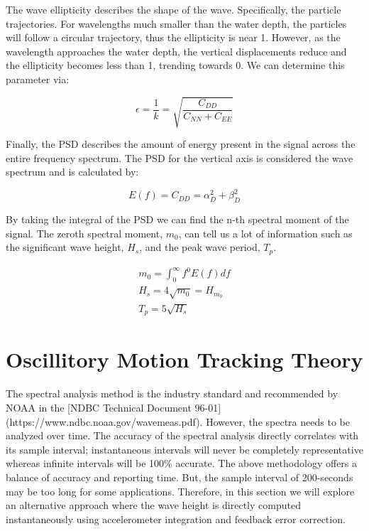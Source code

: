 The wave ellipticity describes the shape of the wave. 
Specifically, the particle trajectories. 
For wavelengths much smaller than the water depth, the particles will follow a circular trajectory, thus the ellipticity is near 1. 
However, as the wavelength approaches the water depth, the vertical displacements reduce and the ellipticity becomes less than 1, trending towards 0. 
We can determine this parameter via:

\begin{equation}
    \epsilon = \frac{1}{k} = \sqrt{\frac{C_{DD}}{C_{NN}+C_{EE}}}
\end{equation}

Finally, the PSD describes the amount of energy present in the signal across the entire frequency spectrum. 
The PSD for the vertical axis is considered the wave spectrum and is calculated by:

\begin{equation}
    E(f) = C_{DD} = \alpha^2_D + \beta^2_D
\end{equation}

By taking the integral of the PSD we can find the n-th spectral moment of the signal. 
The zeroth spectral moment, $m_0$, can tell us a lot of information such as the significant wave height, $H_s$, and the peak wave period, $T_p$.

\begin{gather}
    m_0 = \int^\infty_0 f^0E(f)df \\
    H_s = 4\sqrt{m_0} = H_{m_0} \\
    T_p = 5 \sqrt{H_s}
\end{gather}

\section{Oscillitory Motion Tracking Theory}

The spectral analysis method is the industry standard and recommended by NOAA in the [NDBC Technical Document 96-01](https://www.ndbc.noaa.gov/wavemeas.pdf). 
However, the spectra needs to be analyzed over time. 
The accuracy of the spectral analysis directly correlates with its sample interval; instantaneous intervals will never be completely representative whereas infinite intervals will be 100\% accurate.
The above methodology offers a balance of accuracy and reporting time. 
But, the sample interval of 200-seconds may be too long for some applications. 
Therefore, in this section we will explore an alternative approach where the wave height is directly computed instantaneously using accelerometer integration and feedback error correction.

